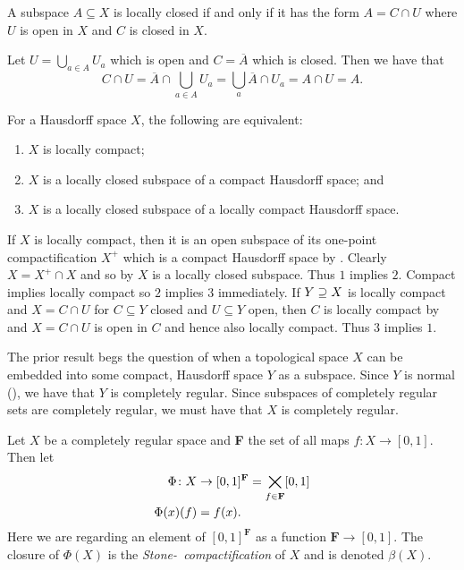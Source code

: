 \documentclass[letterpaper, 11pt, oneside]{book}
\begin{document}
\begin{prop}\label{prop: subspace_locally_closed_iff}
  A subspace $A \subseteq X$ is locally closed if and only if it has the form $A = C \cap U$ where $U$ is open in $X$ and $C$ is closed in $X$.
\end{prop}
\begin{pf}
  Let $U = \bigcup_{a \in A} U_{a}$ which is open and $C = \overline{A}$ which is closed.
  Then we have that
  \[
    C \cap U = \overline{A} \cap \bigcup_{a \in A} U_{a} = \bigcup_{a} \overline{A} \cap U_{a} = A \cap U = A.
  \]
\end{pf}

\clearpage

\begin{thrm}
  For a Hausdorff space $X$, the following are equivalent:
  \begin{enumerate}
  \item $X$ is locally compact;
  \item $X$ is a locally closed subspace of a compact Hausdorff space; and
  \item $X$ is a locally closed subspace of a locally compact Hausdorff space.
  \end{enumerate}
\end{thrm}
\begin{pf}
  If $X$ is locally compact, then it is an open subspace of its one-point compactification $X^{+}$ which is a compact Hausdorff space by .
  Clearly $X = X^{+} \cap X$ and so by  $X$ is a locally closed subspace.
  Thus $1$ implies $2$.
  Compact implies locally compact so $2$ implies $3$ immediately.
  If $Y \supseteq X$ is locally compact and $X = C \cap U$ for $C \subseteq Y$ closed and $U \subseteq Y$ open, then $C$ is locally compact by  and $X = C \cap U$ is open in $C$ and hence also locally compact.
  Thus $3$ implies $1$.
\end{pf}

The prior result begs the question of when a topological space $X$ can be embedded into some compact, Hausdorff space $Y$ as a subspace.
Since $Y$ is normal (), we have that $Y$ is completely regular.
Since subspaces of completely regular sets are completely regular, we must have that $X$ is completely regular.

\begin{defn}
  Let $X$ be a completely regular space and \textbf{F} the set of all maps $f\colon X \to [0, 1]$.
  Then let
  \begin{align*}
    \Phi\colon X &\to [0, 1]^{\textbf{F}} = \bigtimes\limits_{f \in \textbf{F}} [0, 1] \\
            \Phi(x)(f) &= f(x).
  \end{align*}
  Here we are regarding an element of $[0, 1]^{\textbf{F}}$ as a function $\textbf{F} \to [0, 1]$.
  The closure of $\Phi(X)$ is the \emph{Stone-\Cech\ compactification} of $X$ and is denoted $\beta(X)$.
\end{defn}
\end{document}
